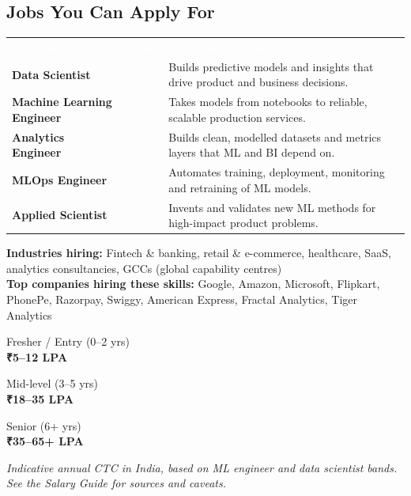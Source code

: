 \documentclass[10pt,a4paper]{article}
\newcommand{\hdr}{\rowcolor{navy}}
\newcommand{\hw}[1]{\textcolor{white}{\bfseries #1}}
\begin{document}
\subsection*{Jobs You Can Apply For}
\par{\small\begin{tabularx}{\linewidth}{@{}>{\raggedright\arraybackslash}p{4.6cm}>{\raggedright\arraybackslash}p{2.5cm}Y@{}}\hdr\hw{Job role}&\hw{Level}&\hw{What the role does}\\
\textbf{Data Scientist} &  & Builds predictive models and insights that drive product and business decisions.\\
\textbf{Machine Learning Engineer} &  & Takes models from notebooks to reliable, scalable production services.\\
\textbf{Analytics Engineer} &  & Builds clean, modelled datasets and metrics layers that ML and BI depend on.\\
\textbf{MLOps Engineer} &  & Automates training, deployment, monitoring and retraining of ML models.\\
\textbf{Applied Scientist} &  & Invents and validates new ML methods for high-impact product problems.\\
\end{tabularx}}
{\small\textbf{Industries hiring:} Fintech \& banking, retail \& e-commerce, healthcare, SaaS, analytics consultancies, GCCs (global capability centres)\\[2pt]\textbf{Top companies hiring these skills:} Google, Amazon, Microsoft, Flipkart, PhonePe, Razorpay, Swiggy, American Express, Fractal Analytics, Tiger Analytics}
\begin{tcbraster}[raster columns=3,raster column skip=6pt,raster equal height]
\begin{tcolorbox}[colback=l1bg,colframe=l1bg,arc=2pt,halign=center,borderline north={2.5pt}{0pt}{saffron},top=3pt,bottom=3pt]{\scriptsize\color{muted}Fresher / Entry (0--2 yrs)}\\{\large\bfseries\color{saffront}₹5–12 LPA}\end{tcolorbox}
\begin{tcolorbox}[colback=l2bg,colframe=l2bg,arc=2pt,halign=center,borderline north={2.5pt}{0pt}{chakra},top=3pt,bottom=3pt]{\scriptsize\color{muted}Mid-level (3--5 yrs)}\\{\large\bfseries\color{chakra}₹18–35 LPA}\end{tcolorbox}
\begin{tcolorbox}[colback=l3bg,colframe=l3bg,arc=2pt,halign=center,borderline north={2.5pt}{0pt}{igreen},top=3pt,bottom=3pt]{\scriptsize\color{muted}Senior (6+ yrs)}\\{\large\bfseries\color{igreent}₹35–65+ LPA}\end{tcolorbox}
\end{tcbraster}
{\footnotesize\itshape\color{muted}Indicative annual CTC in India, based on ML engineer and data scientist bands. See the Salary Guide for sources and caveats.}
\end{document}
